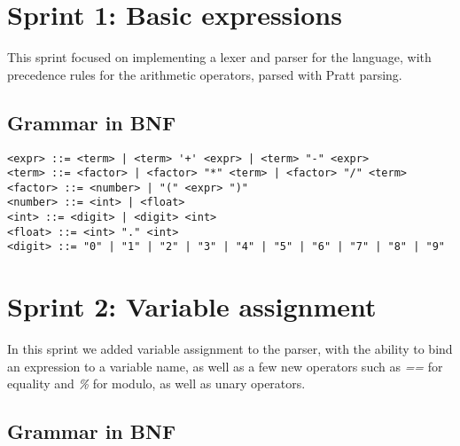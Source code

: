 \section{Sprint 1: Basic expressions}\label{sec:sprint-1:-basic-expressions}

This sprint focused on implementing a lexer and parser for the language, with precedence rules for the arithmetic 
operators, parsed with Pratt parsing.

\subsection{Grammar in BNF}\label{subsec:grammar-in-bnf1}

\begin{verbatim}
<expr> ::= <term> | <term> '+' <expr> | <term> "-" <expr>
<term> ::= <factor> | <factor> "*" <term> | <factor> "/" <term>
<factor> ::= <number> | "(" <expr> ")"
<number> ::= <int> | <float>
<int> ::= <digit> | <digit> <int>
<float> ::= <int> "." <int>
<digit> ::= "0" | "1" | "2" | "3" | "4" | "5" | "6" | "7" | "8" | "9"
\end{verbatim}

\section{Sprint 2: Variable assignment}\label{sec:variable-assignment}

In this sprint we added variable assignment to the parser, with the ability to bind an expression to a variable 
name, as well as a few new operators such as \textit{==} for equality and \textit{\%} for modulo, as well as 
unary operators.

\subsection{Grammar in BNF}\label{subsec:grammar-in-bnf2}


